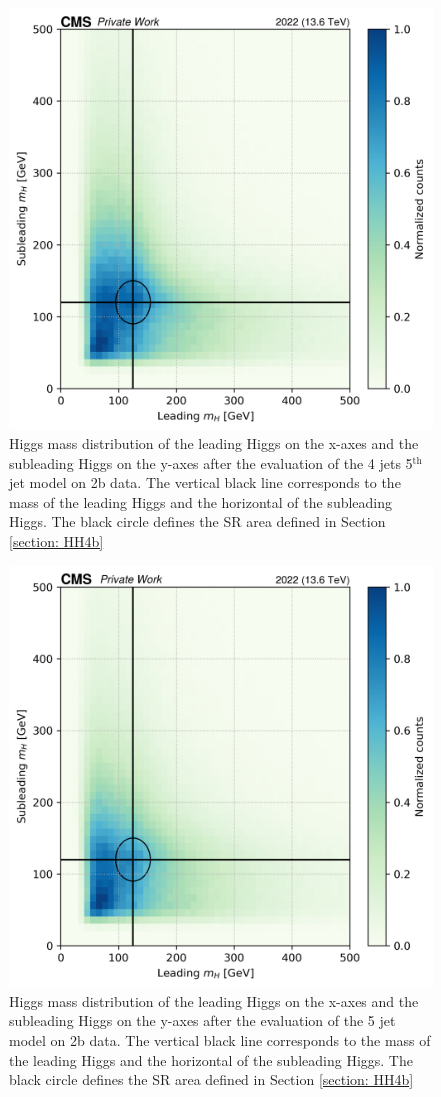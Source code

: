 \begin{figure}[hbt]
    \centering
    \includegraphics[width=0.6\linewidth]{Images/6.Improving/Mass sculpting/mass sculpting 4j5g.png}
    \caption{Higgs mass distribution of the leading Higgs on the x-axes and the subleading Higgs on the y-axes after the evaluation of the 4 jets 5$^{\text{th}}$ jet model on 2b data. The vertical black line corresponds to the mass of the leading Higgs and the horizontal of the subleading Higgs. The black circle defines the SR area defined in Section \ref{section: HH4b}}
    \label{fig: 2D mass sculpting for 4j5g}
\end{figure}



\begin{figure}[hbt]
    \centering
    \includegraphics[width=0.6\linewidth]{Images/6.Improving/Mass sculpting/mass sculptimg 5j.png}
    \caption{Higgs mass distribution of the leading Higgs on the x-axes and the subleading Higgs on the y-axes after the evaluation of the 5 jet model on 2b data. The vertical black line corresponds to the mass of the leading Higgs and the horizontal of the subleading Higgs. The black circle defines the SR area defined in Section \ref{section: HH4b}}
    \label{fig: 2D mass sculpting for 5j}
\end{figure}


